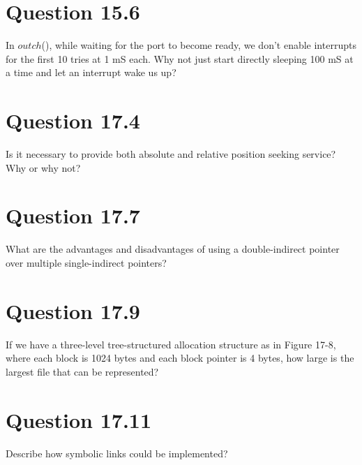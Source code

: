 \documentclass{article}
\begin{document}
\section*{Question 15.6}
In $outch$(), while waiting for the port to become ready, we don't enable interrupts for the first 10 tries at 1 mS each.
Why not just start directly sleeping 100 mS at a time and let an interrupt wake us up?
\newline

\section*{Question 17.4}
Is it necessary to provide both absolute and relative position seeking service?
Why or why not?
\newline

\section*{Question 17.7}
What are the advantages and disadvantages of using a double-indirect pointer over multiple single-indirect pointers?
\newline

\section*{Question 17.9}
If we have a three-level tree-structured allocation structure as in Figure 17-8, where each block is 1024 bytes and each block pointer is 4 bytes, how large is the largest file that can be represented?
\newline

\section*{Question 17.11}
Describe how symbolic links could be implemented?
\newline
\end{document}
